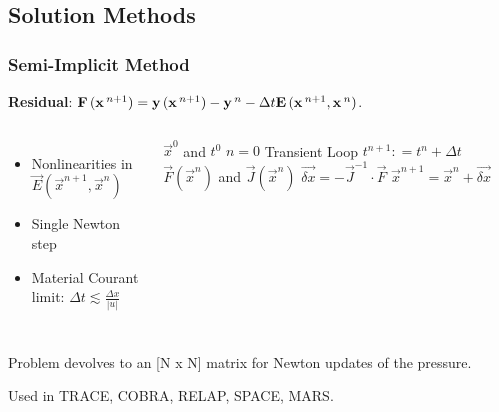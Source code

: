 \documentclass[compress,xcolor=table]{beamer}
\newlength{\hpw}
\begin{document}
\subsection[Solution Methods]{Solution Methods}
\begin{frame}
\frametitle{Semi-Implicit Method}
\textbf{Residual}: $\vec{F}(\vec{x}^{n+1}) = \vec{y}(\vec{x}^{n+1}) - \vec{y}^{n} - \dt{} \vec{E}(\vec{x}^{n+1},\vec{x}^{n})$.

\begin{columns}
\column{\hpw}

\begin{itemize}
\item{Nonlinearities in $\vec{E}(\vec{x}^{n+1},\vec{x}^{n})$}
\item{Single Newton step}
\item{Material Courant limit: $ \Delta t \lesssim \frac{\Delta x}{|u|}$}
\end{itemize}

\column{\hpw}

\begin{algorithmic}
\scriptsize
\Require $\vec{x}^{0}$ and $t^{0}$
\Set $n = 0$
\Loop \; Transient Loop
    \State $t^{n+1} : = t^{n} + \Delta t$
	\Calculate $\vec{F}(\vec{x}^{n})$ and $\vec{J}(\vec{x}^{n})$
	\Calculate $\vec{\delta x} = - \vec{J}^{-1}\cdot\vec{F}$
	\Calculate $\vec{x}^{n+1} = \vec{x}^{n} + \vec{\delta x}$
\end{algorithmic}
\end{columns}

Problem devolves to an [N x N] matrix for Newton updates of the pressure. 

Used in TRACE, COBRA, RELAP, SPACE, MARS.

\end{frame}
\end{document}
